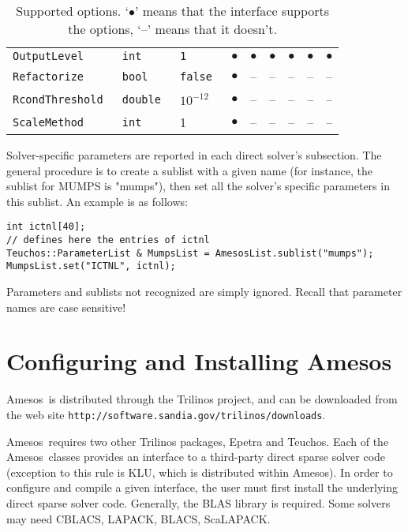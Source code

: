 \documentclass[11pt]{SANDreport}
\newcommand{\amesos}{{\sc Amesos}}
\begin{document}
\begin{sidewaystable}[tbhp]
\begin{tabular}{| p{5cm} | p{2cm} | p{2cm} | c | c | c
      | c | c | c |}
    \tt OutputLevel         & \tt int    & \tt 1      & $\bullet$ & $\bullet$ & $\bullet$ & $\bullet$ & $\bullet$  & $\bullet$\\
    \tt Refactorize         & \tt bool   & \tt false  & $\bullet$ & -- & -- & -- & -- & -- \\
    \tt RcondThreshold      & \tt double & $10^{-12}$ & $\bullet$ & -- & -- & -- & -- &--\\
    \tt ScaleMethod         & \tt int    & 1          & $\bullet$ & -- & -- & -- & -- &--\\
    \hline
  \end{tabular}
  \caption{Supported options. `$\bullet$' means that the interface
    supports the options, `--' means that it doesn't.}
  \label{tab:options}
\end{sidewaystable}

Solver-specific parameters are reported in each direct solver's subsection.
The general procedure is to create a sublist with a given name (for
instance, the sublist for MUMPS is "mumps"), then set all the
solver's specific parameters in this sublist. An example is as follows:
\begin{verbatim}
int ictnl[40];
// defines here the entries of ictnl
Teuchos::ParameterList & MumpsList = AmesosList.sublist("mumps");
MumpsList.set("ICTNL", ictnl);
\end{verbatim}
Parameters and sublists not recognized are simply ignored. Recall that
parameter names are case sensitive!

\section{Configuring and Installing \amesos}
\label{sec:configuration}

\amesos\ is distributed through the Trilinos project, and can be
downloaded from the web site
\verb!http://software.sandia.gov/trilinos/downloads!.

\amesos\ requires two other {\sc Trilinos} packages, {\sc Epetra} and {\sc
  Teuchos}. 
Each of the \amesos\ classes provides an interface to a third-party direct
sparse solver code (exception to this rule is KLU, which is
  distributed within \amesos). In order to configure and compile a given
interface, the user must first install the underlying direct sparse
solver code. Generally, the BLAS library is required. Some solvers may
need CBLACS, LAPACK, BLACS, ScaLAPACK. 
\end{document}
